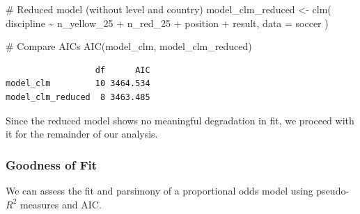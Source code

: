 \documentclass[
  letterpaper,
  DIV=11,
  numbers=noendperiod]{scrartcl}
\newenvironment{Shaded}{\begin{snugshade}}{\end{snugshade}}
\newcommand{\AttributeTok}[1]{\textcolor[rgb]{0.40,0.45,0.13}{#1}}
\newcommand{\CommentTok}[1]{\textcolor[rgb]{0.37,0.37,0.37}{#1}}
\newcommand{\FunctionTok}[1]{\textcolor[rgb]{0.28,0.35,0.67}{#1}}
\newcommand{\NormalTok}[1]{\textcolor[rgb]{0.00,0.23,0.31}{#1}}
\newcommand{\OtherTok}[1]{\textcolor[rgb]{0.00,0.23,0.31}{#1}}
\newcommand{\SpecialCharTok}[1]{\textcolor[rgb]{0.37,0.37,0.37}{#1}}
\begin{document}
\begin{Shaded}
\begin{Highlighting}[]
\CommentTok{\# Reduced model (without level and country)}
\NormalTok{model\_clm\_reduced }\OtherTok{\textless{}{-}} \FunctionTok{clm}\NormalTok{(}
\NormalTok{  discipline }\SpecialCharTok{\textasciitilde{}}\NormalTok{ n\_yellow\_25 }\SpecialCharTok{+}\NormalTok{ n\_red\_25 }\SpecialCharTok{+}\NormalTok{ position }\SpecialCharTok{+}\NormalTok{ result,}
  \AttributeTok{data =}\NormalTok{ soccer}
\NormalTok{)}

\CommentTok{\# Compare AICs}
\FunctionTok{AIC}\NormalTok{(model\_clm, model\_clm\_reduced)}
\end{Highlighting}
\end{Shaded}

\begin{verbatim}
                  df      AIC
model_clm         10 3464.534
model_clm_reduced  8 3463.485
\end{verbatim}

Since the reduced model shows no meaningful degradation in fit, we
proceed with it for the remainder of our analysis.

\hypertarget{goodness-of-fit}{%
\subsubsection*{Goodness of Fit}\label{goodness-of-fit}}

We can assess the fit and parsimony of a proportional odds model using
pseudo-\(R^2\) measures and AIC.
\end{document}
